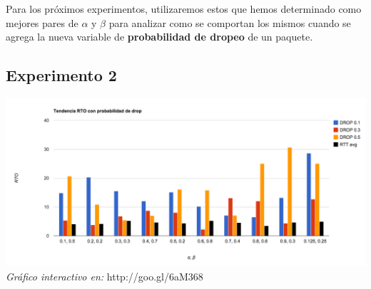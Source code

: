 Para los próximos experimentos, utilizaremos estos que hemos determinado como mejores pares de $\alpha$ y $\beta$ para analizar como se comportan los mismos cuando se agrega la nueva variable de \textbf{probabilidad de dropeo} de un paquete.

\subsection{Experimento 2}

\begin{center}
	\includegraphics[scale=0.35]{graphics/tendencia_RTO_drop.png}
	\textit{Gráfico interactivo en:} http://goo.gl/6aM368
\end{center}
